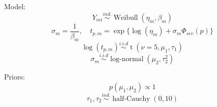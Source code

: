 \documentclass{article}
\begin{document}
Model:
\[Y_{mi} \stackrel{ind.}{\sim} \operatorname{Weibull}(\eta_m, \beta_m)\]
\[\sigma_m = \frac{1}{\beta_m}, \quad t_{p,m} = \exp\{\log(\eta_m) + \sigma_m \Phi_{sev}(p)\}\]
\[\log(t_{p,m}) \stackrel{i.i.d}{\sim} \operatorname{t}(\nu = 5, \mu_1, \tau_1)\]
\[\sigma_m \stackrel{i.i.d}{\sim} \operatorname{log-normal}(\mu_2, \tau^2_2)\]

Priors:
\[p(\mu_1,\mu_2) \propto 1\]
\[\tau_1,\tau_2 \stackrel{ind.}{\sim} \operatorname{half-Cauchy}(0,10)\]
\end{document}
